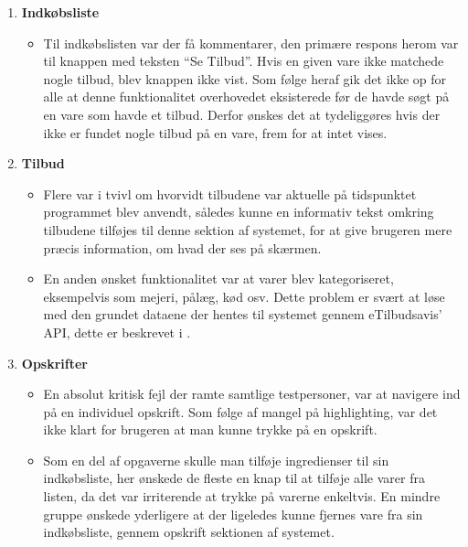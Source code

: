 \begin{enumerate}
   \item \textbf{Indkøbsliste} \begin{itemize}
   								  \item Til indkøbslisten var der få kommentarer, den primære respons herom var til knappen med teksten ``Se Tilbud''. Hvis en given vare ikke matchede nogle tilbud, blev knappen ikke vist. Som følge heraf gik det ikke op for alle at denne funktionalitet overhovedet eksisterede før de havde søgt på en vare som havde et tilbud. Derfor ønskes det at tydeliggøres hvis der ikke er fundet nogle tilbud på en vare, frem for at intet vises.
   							   \end{itemize}
   \item \textbf{Tilbud}\begin{itemize}
   								  \item Flere var i tvivl om hvorvidt tilbudene var aktuelle på tidspunktet programmet blev anvendt, således kunne en informativ tekst omkring tilbudene tilføjes til denne sektion af systemet, for at give brugeren mere præcis information, om hvad der ses på skærmen.
   								  
   								  \item En anden ønsket funktionalitet var at varer blev kategoriseret, eksempelvis som mejeri, pålæg, kød osv. Dette problem er svært at løse med den grundet dataene der hentes til systemet gennem eTilbudsavis' API, dette er beskrevet i .
   							   \end{itemize}
   \item \textbf{Opskrifter}\begin{itemize}
   								  \item En absolut kritisk fejl der ramte samtlige testpersoner, var at navigere ind på en individuel opskrift. Som følge af mangel på highlighting, var det ikke klart for brugeren at man kunne trykke på en opskrift.
   								  
   								  \item Som en del af opgaverne skulle man tilføje ingredienser til sin indkøbsliste, her ønskede de fleste en knap til at tilføje alle varer fra listen, da det var irriterende at trykke på varerne enkeltvis.
   								  En mindre gruppe ønskede yderligere at der ligeledes kunne fjernes vare fra sin indkøbsliste, gennem opskrift sektionen af systemet.
   								  

\end{itemize}
\end{enumerate}
